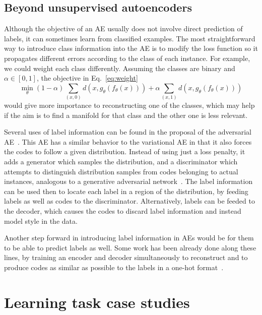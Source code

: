 \subsection{Beyond unsupervised autoencoders}

Although the objective of an AE usually does not involve direct prediction of labels, it can sometimes learn from classified examples. The most straightforward way to introduce class information into the AE is to modify the loss function so it propagates different errors according to the class of each instance. For example, we could weight each class differently. Assuming the classes are binary and $\alpha\in[0,1]$, the objective in Eq.~\eqref{eq:weight}
\begin{equation}\label{p5eq:weight}
    \min_{\theta}(1-\alpha)\sum_{(x,0)} d(x,g_{\theta}(f_{\theta}(x)))+\alpha\sum_{(x,1)} d(x,g_{\theta}(f_{\theta}(x)))
\end{equation}
would give more importance to reconstructing one of the classes, which may help if the aim is to find a manifold for that class and the other one is less relevant.

Several uses of label information can be found in the proposal of the adversarial AE~\cite{adv}. This AE has a similar behavior to the variational AE in that it also forces the codes to follow a given distribution. Instead of using just a loss penalty, it adds a generator which samples the distribution, and a discriminator which attempts to distinguish distribution samples from codes belonging to actual instances, analogous to a generative adversarial network~\cite{gan}. The label information can be used then to locate each label in a region of the distribution, by feeding labels as well as codes to the discriminator. Alternatively, labels can be feeded to the decoder, which causes the codes to discard label information and instead model style in the data.

Another step forward in introducing label information in AEs would be for them to be able to predict labels as well. Some work has been already done along these lines, by training an encoder and decoder simultaneously to reconstruct and to produce codes as similar as possible to the labels in a one-hot format~\cite{zhuang2015supervised}.

\section{Learning task case studies}\label{p5sec:cs}

